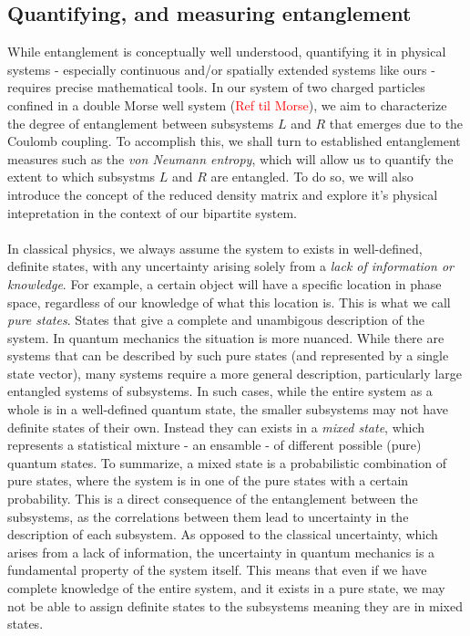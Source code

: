 \documentclass{subfiles}
\begin{document}
\subsection*{Quantifying, and measuring entanglement}
While entanglement is conceptually well understood, quantifying it in physical systems - especially continuous and/or spatially extended systems like ours - requires precise mathematical tools. In our system of two charged particles confined in a double Morse well system (\textcolor{red}{Ref til Morse}), we aim to characterize the degree of entanglement between subsystems $L$ and $R$ that emerges due to the Coulomb coupling. To accomplish this, we shall turn to established entanglement measures such as the \emph{von Neumann entropy}, which will allow us to quantify the extent to which subsystms $L$ and $R$ are entangled. To do so, we will also introduce the concept of the reduced density matrix and explore it's physical intepretation in the context of our bipartite system.
\\ \\
In classical physics, we always assume the system to exists in well-defined, definite states, with any uncertainty arising solely from a \emph{lack of information or knowledge}. For example, a certain object will have a specific location in phase space, regardless of our knowledge of what this location is. This is what we call \emph{pure states}. States that give a complete and unambigous description of the system. In quantum mechanics the situation is more nuanced. While there are systems that can be described by such pure states (and represented by a single state vector), many systems require a more general description, particularly large entangled systems of subsystems. In such cases, while the entire system as a whole is in a well-defined quantum state, the smaller subsystems may not have definite states of their own. Instead they can exists in a \emph{mixed state}, which represents a statistical mixture - an ensamble - of different possible (pure) quantum states.
To summarize, a mixed state is a probabilistic combination of pure states, where the system is in one of the pure states with a certain probability. This is a direct consequence of the entanglement between the subsystems, as the correlations between them lead to uncertainty in the description of each subsystem. As opposed to the classical uncertainty, which arises from a lack of information, the uncertainty in quantum mechanics is a fundamental property of the system itself. This means that even if we have complete knowledge of the entire system, and it exists in a pure state, we may not be able to assign definite states to the subsystems meaning they are in mixed states. 
\end{document}
